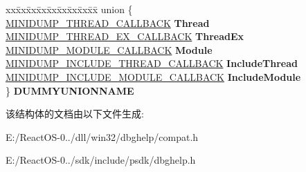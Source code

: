 \begin{DoxyCompactItemize}
\begin{tabbing}
\end{tabbing}\item 
\mbox{\label{struct___m_i_n_i_d_u_m_p___c_a_l_l_b_a_c_k___i_n_p_u_t_a9b12026599cdd241561fd3c956ba655d}} 
\begin{tabbing}
xx\=xx\=xx\=xx\=xx\=xx\=xx\=xx\=xx\=\kill
union \{\\
\>\hyperlink{struct___m_i_n_i_d_u_m_p___t_h_r_e_a_d___c_a_l_l_b_a_c_k}{MINIDUMP\_THREAD\_CALLBACK} {\bfseries Thread}\\
\>\hyperlink{struct___m_i_n_i_d_u_m_p___t_h_r_e_a_d___e_x___c_a_l_l_b_a_c_k}{MINIDUMP\_THREAD\_EX\_CALLBACK} {\bfseries ThreadEx}\\
\>\hyperlink{struct___m_i_n_i_d_u_m_p___m_o_d_u_l_e___c_a_l_l_b_a_c_k}{MINIDUMP\_MODULE\_CALLBACK} {\bfseries Module}\\
\>\hyperlink{struct___m_i_n_i_d_u_m_p___i_n_c_l_u_d_e___t_h_r_e_a_d___c_a_l_l_b_a_c_k}{MINIDUMP\_INCLUDE\_THREAD\_CALLBACK} {\bfseries IncludeThread}\\
\>\hyperlink{struct___m_i_n_i_d_u_m_p___i_n_c_l_u_d_e___m_o_d_u_l_e___c_a_l_l_b_a_c_k}{MINIDUMP\_INCLUDE\_MODULE\_CALLBACK} {\bfseries IncludeModule}\\
\} {\bfseries DUMMYUNIONNAME}\\

\end{tabbing}\end{DoxyCompactItemize}


该结构体的文档由以下文件生成\+:\begin{DoxyCompactItemize}
\item 
E\+:/\+React\+O\+S-\/0../dll/win32/dbghelp/compat.\+h\item 
E\+:/\+React\+O\+S-\/0../sdk/include/psdk/dbghelp.\+h\end{DoxyCompactItemize}
